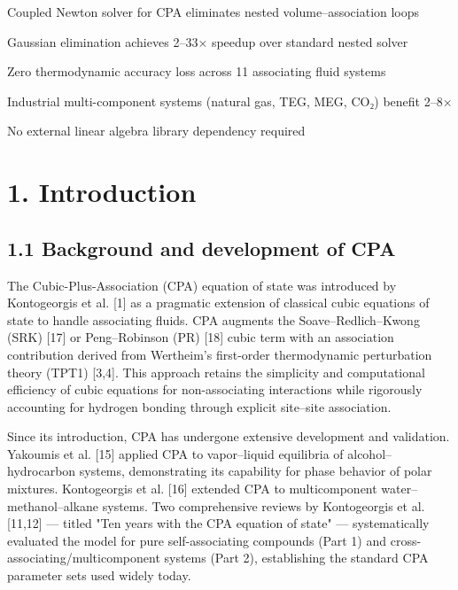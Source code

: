 \documentclass[review,3p]{elsarticle}
\begin{document}
\begin{frontmatter}
\begin{highlights}
\item Coupled Newton solver for CPA eliminates nested volume–association loops
\item Gaussian elimination achieves 2–33× speedup over standard nested solver
\item Zero thermodynamic accuracy loss across 11 associating fluid systems
\item Industrial multi-component systems (natural gas, TEG, MEG, CO₂) benefit 2–8×
\item No external linear algebra library dependency required
\end{highlights}

\end{frontmatter}

\section{1. Introduction}



\subsection{1.1 Background and development of CPA}

The Cubic-Plus-Association (CPA) equation of state was introduced by Kontogeorgis et al. [1] as a pragmatic extension of classical cubic equations of state to handle associating fluids. CPA augments the Soave–Redlich–Kwong (SRK) [17] or Peng–Robinson (PR) [18] cubic term with an association contribution derived from Wertheim's first-order thermodynamic perturbation theory (TPT1) [3,4]. This approach retains the simplicity and computational efficiency of cubic equations for non-associating interactions while rigorously accounting for hydrogen bonding through explicit site–site association.

Since its introduction, CPA has undergone extensive development and validation. Yakoumis et al. [15] applied CPA to vapor–liquid equilibria of alcohol–hydrocarbon systems, demonstrating its capability for phase behavior of polar mixtures. Kontogeorgis et al. [16] extended CPA to multicomponent water–methanol–alkane systems. Two comprehensive reviews by Kontogeorgis et al. [11,12] — titled "Ten years with the CPA equation of state" — systematically evaluated the model for pure self-associating compounds (Part 1) and cross-associating/multicomponent systems (Part 2), establishing the standard CPA parameter sets used widely today.
\end{document}
